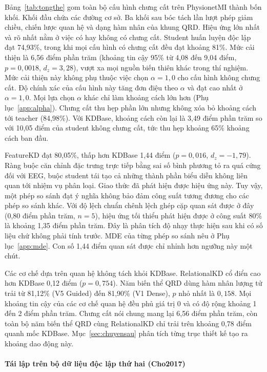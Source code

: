 Bảng~\ref{tab:tongthe} gom toàn bộ cấu hình chưng cất trên PhysionetMI
thành bốn khối. Khối đầu chứa các đường cơ sở. Ba khối sau bóc tách lần
lượt phép giảm chiều, chiến lược quan hệ và dạng hàm nhân của khung QRD.
Hiệu ứng lớn nhất và rõ nhất nằm ở việc có hay không có chưng cất. Student
huấn luyện độc lập đạt 74,93\%, trong khi mọi cấu hình có chưng cất đều đạt
khoảng 81\%. Mức cải thiện là 6,56 điểm phần trăm (khoảng tin cậy 95\% từ
4,08 đến 9,04 điểm, $p = 0{,}0018$, $d_z = 3{,}28$), vượt xa mọi nguồn biến
thiên khác trong thí nghiệm. Mức cải thiện này không phụ thuộc việc chọn
$\alpha = 1{,}0$ cho cấu hình không chưng cất. Độ chính xác của cấu hình
này tăng đơn điệu theo $\alpha$ và đạt cao nhất ở $\alpha = 1{,}0$. Mọi
lựa chọn $\alpha$ khác chỉ làm khoảng cách lớn hơn
(Phụ lục~\ref{app:alpha}). Chưng cất thu hẹp phần lớn nhưng không xóa bỏ
khoảng cách tới teacher (84,98\%). Với KDBase, khoảng cách còn lại là 3,49
điểm phần trăm so với 10,05 điểm của student không chưng cất, tức thu hẹp
khoảng 65\% khoảng cách ban đầu.

FeatureKD đạt 80,05\%, thấp hơn KDBase 1,44 điểm ($p = 0{,}016$,
$d_z = -1{,}79$). Ràng buộc căn chỉnh đặc trưng trực tiếp bằng sai số bình
phương tỏ ra quá cứng đối với EEG, buộc student tái tạo cả những thành phần
biểu diễn không liên quan tới nhiệm vụ phân loại. Giao thức đã phát hiện
được hiệu ứng này. Tuy vậy, một phép so sánh đạt ý nghĩa không bảo đảm công
suất tương đương cho các phép so sánh khác. Với độ lệch chuẩn chênh lệch
ghép cặp quan sát được ở đây (0,80 điểm phần trăm, $n=5$), hiệu ứng tối
thiểu phát hiện được ở công suất 80\% là khoảng 1,35 điểm phần trăm. Đây là
phân tích độ nhạy thực hiện sau khi có số liệu chứ không phải tính trước.
MDE của từng phép so sánh nêu ở Phụ lục~\ref{app:mde}.
Con số 1,44 điểm quan sát được chỉ nhỉnh hơn ngưỡng này một chút.

Các cơ chế dựa trên quan hệ không tách khỏi KDBase. RelationalKD cổ điển
cao hơn KDBase 0,12 điểm ($p = 0{,}754$). Năm biến thể QRD dùng hàm nhân
lượng tử trải từ 81,12\% (V5 Guided) đến 81,90\% (V1 Dense), $p$ nhỏ nhất
là $0{,}158$. Mọi khoảng tin cậy của các cơ chế quan hệ đều phủ giá trị 0
và có độ rộng khoảng 1 đến 2 điểm phần trăm. Chưng cất nói chung mang lại
6,56 điểm phần trăm, còn toàn bộ năm biến thể QRD cùng RelationalKD chỉ
trải trên khoảng 0,78 điểm quanh mốc KDBase. Mục~\ref{sec:chuyensau} phân
tích từng trục thiết kế tạo ra khoảng dao động này.

\paragraph{Tái lập trên bộ dữ liệu độc lập thứ hai (Cho2017)}

